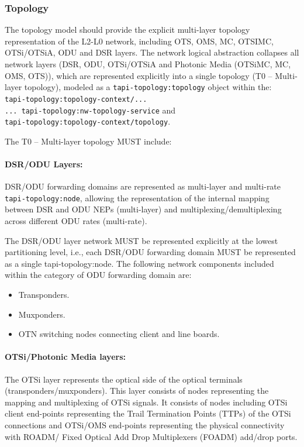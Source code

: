 \documentclass[a4paper,fleqn]{cas-dc}
\begin{document}
\subsubsection{Topology}
\label{subsection:OPTopo}

The topology model should provide the explicit multi-layer topology representation of the L2-L0 network, including OTS, OMS, MC, OTSIMC, OTSi/OTSiA, ODU and DSR layers. The network logical abstraction collapses all network layers (DSR, ODU, OTSi/OTSiA and Photonic Media (OTSiMC, MC, OMS, OTS)), which are represented explicitly into a single topology (T0 – Multi-layer topology), modeled as a \texttt{tapi-topology:topology} object within the: \\
\texttt{tapi-topology:topology-context/... \\
... tapi-topology:nw-topology-service} and \\ \texttt{tapi-topology:topology-context/topology}. 

The T0 – Multi-layer topology MUST include:

\paragraph{DSR/ODU Layers:}
DSR/ODU forwarding domains are represented as multi-layer and multi-rate \texttt{tapi-topology:node}, allowing the representation of the internal mapping between DSR and ODU NEPs (multi-layer) and multiplexing/demultiplexing across different ODU rates (multi-rate). 

The DSR/ODU layer network MUST be represented explicitly at the lowest partitioning level, i.e., each DSR/ODU forwarding domain MUST be represented as a single tapi-topology:node. The following network components included within the category of ODU forwarding domain are:

\begin{itemize}
    \item Transponders.
    \item Muxponders.
    \item OTN switching nodes connecting client and line boards.
\end{itemize}

\paragraph{OTSi/Photonic Media layers:}
The OTSi layer represents the optical side of the optical terminals (transponders/muxponders). This layer consists of nodes representing the mapping and multiplexing of OTSi signals. It consists of nodes including OTSi client end-points representing the Trail Termination Points (TTPs) of the OTSi connections and OTSi/OMS end-points representing the physical connectivity with ROADM/ Fixed Optical Add Drop Multiplexers (FOADM) add/drop ports.
\end{document}
